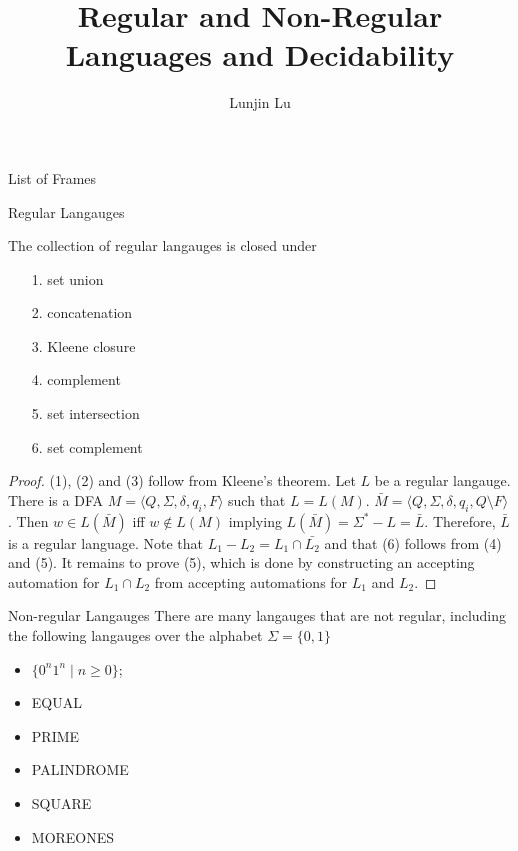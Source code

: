 \documentclass{beamer}
\title{Regular and Non-Regular Languages and Decidability}
\author{Lunjin Lu}
\date{}
\makeatletter
\newif\ifframeinlbf
\newcommand\listofframes{\@starttoc{lbf}}
\makeatother
\begin{document}
\begin{comment}
\end{comment}
\frameinlbffalse
\begin{frame}{List of Frames}
    \listofframes
\end{frame}
\frameinlbftrue


\frame{ \titlepage
}

\begin{frame}{Regular Langauges} 
\begin{theorem} 
The collection of regular langauges is closed under 
\begin{itemize} \small
  \item [1.] set union
  \item [2.] concatenation
  \item [3.] Kleene closure
  \item [4.] complement 
  \item [5.] set intersection
  \item [6.] set complement
\end{itemize}

\begin{proof}
(1), (2) and (3) follow from Kleene's theorem. Let $L$ be a regular langauge. 
There is a DFA $M=\langle Q,\Sigma,\delta,q_i, F\rangle$ such that $L=L(M)$. 
$\bar{M}=\langle Q,\Sigma,\delta,q_i, Q\setminus F\rangle$. Then 
$w\in L(\bar{M})$ iff $w\not\in L(M)$ implying $L(\bar{M})=\Sigma^*-L=\bar{L}$. 
Therefore, $\bar{L}$ is a regular language. Note that $L_1-L_2=L_1\cap \bar{L_2}$ and that (6) follows from (4) and (5). 
It remains to prove (5), which is done by constructing an accepting  automation for $L_1\cap L_2$ from accepting automations for   
$L_1$ and $L_2$. 
\end{proof}
\end{theorem}
\end{frame}

\begin{frame}{Non-regular Langauges}
There are many langauges that are not regular, including the following langauges over the alphabet $\Sigma=\{0,1\}$
\begin{itemize}
  \item $\{0^n 1^n\mid n\geq 0\}$;
  \item EQUAL
  \item PRIME
  \item PALINDROME
  \item SQUARE
  \item MOREONES
\end{itemize}
\end{frame}
\end{document}
